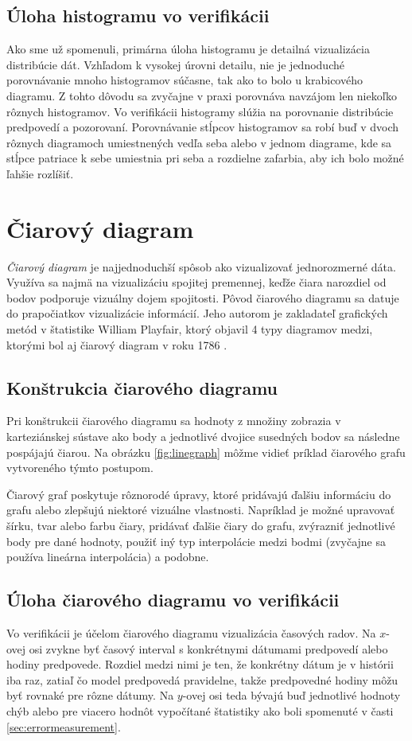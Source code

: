  
\subsection{Úloha histogramu vo verifikácii}
Ako sme už spomenuli, primárna úloha histogramu je detailná vizualizácia distribúcie dát. Vzhľadom k vysokej úrovni detailu, nie je jednoduché porovnávanie mnoho histogramov súčasne, tak ako to bolo u krabicového diagramu. Z tohto dôvodu sa zvyčajne v praxi porovnáva navzájom len niekoľko rôznych histogramov. Vo verifikácii histogramy slúžia na porovnanie distribúcie predpovedí a pozorovaní. Porovnávanie stĺpcov histogramov sa robí buď v dvoch rôznych diagramoch umiestnených vedľa seba alebo v jednom diagrame, kde sa stĺpce patriace k sebe umiestnia pri seba a rozdielne zafarbia, aby ich bolo možné ľahšie rozlíšiť.

\section{Čiarový diagram}
\label{sec:linegraph}
\textit{Čiarový diagram} je najjednoduchší spôsob ako vizualizovať jednorozmerné dáta. Využíva sa najmä na vizualizáciu spojitej premennej, keďže čiara narozdiel od bodov podporuje vizuálny dojem spojitosti. Pôvod čiarového diagramu sa datuje do prapočiatkov vizualizácie informácií. Jeho autorom je zakladateľ grafických metód v štatistike William Playfair, ktorý objavil 4 typy diagramov medzi, ktorými bol aj čiarový diagram v roku 1786 \cite{HistoryOfInfoVis}.

\subsection{Konštrukcia čiarového diagramu}
Pri konštrukcii čiarového diagramu sa hodnoty z množiny zobrazia v karteziánskej sústave ako body a jednotlivé dvojice susedných bodov sa následne pospájajú čiarou. Na obrázku \ref{fig:linegraph} môžme vidieť príklad čiarového grafu vytvoreného týmto postupom.

Čiarový graf poskytuje rôznorodé úpravy, ktoré pridávajú ďalšiu informáciu do grafu alebo zlepšujú niektoré vizuálne vlastnosti. Napríklad je možné upravovať šírku, tvar alebo farbu čiary, pridávať ďalšie čiary do grafu, zvýrazniť jednotlivé body pre dané hodnoty, použiť iný typ interpolácie medzi bodmi (zvyčajne sa používa lineárna interpolácia) a podobne.

\subsection{Úloha čiarového diagramu vo verifikácii}
Vo verifikácii je účelom čiarového diagramu vizualizácia časových radov. Na \mbox{$ x $-ovej} osi zvykne byť časový interval s konkrétnymi dátumami predpovedí alebo hodiny predpovede. Rozdiel medzi nimi je ten, že konkrétny dátum je v histórii iba raz, zatiaľ čo model predpovedá pravidelne, takže predpovedné hodiny môžu byť rovnaké pre rôzne dátumy. Na \mbox{$ y $-ovej} osi teda bývajú buď jednotlivé hodnoty chýb alebo pre viacero hodnôt vypočítané štatistiky ako boli spomenuté v časti \ref{sec:errormeasurement}.
 

